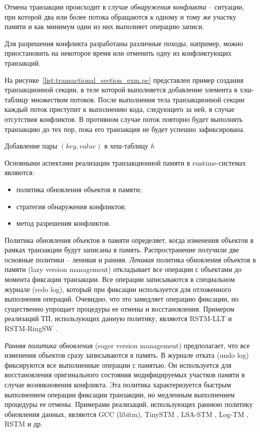 Отмена транзакции происходит в случае \textit{обнаружения конфликта} -- ситуации, при которой два или более потока обращаются к одному и тому же участку памяти и как минимум один из них выполняет операцию записи.

Для разрешения конфликта разработаны различные походы, например, можно приостановить на некоторое время или отменить одну из конфликтующих транзакций.

На рисунке~\ref{list:transactional_section_exm.pc} представлен пример создания транзакционной секции, в теле которой выполняется добавление элемента в хэш-таблицу множеством потоков. После выполнения тела транзакционной секции каждый поток приступит к выполнению кода, следующего за ней, в случае отсутствия конфликтов. В противном случае поток повторно будет выполнять транзакцию до тех пор, пока его транзакция не будет успешно зафиксирована.

\begin{ListingEnv}[!h]
  
    \caption{Добавление пары $(key, value)$ в хеш-таблицу $h$}
    \label{list:transactional_section_exm.pc}
\end{ListingEnv}

Основными аспектами реализации транзакционной памяти в runtime-системах являются:
\begin{itemize}
\item политика обновления объектов в памяти;
\item стратегия обнаружения конфликтов;
\item метод разрешения конфликтов.
\end{itemize}

Политика обновления объектов в памяти определяет, когда изменения объектов в рамках транзакции будут записаны в память. Распространение получили две основные политики -- ленивая и ранняя. \textit{Ленивая} политика обновления объектов в памяти (lazy version management) откладывает все операции с объектами до момента фиксации транзакции. Все операции записываются в специальном журнале (redo log), который при фиксации используется для отложенного выполнения операций. Очевидно, что это замедляет операцию фиксации, но существенно упрощает процедуры ее отмены и восстановления. Примером реализаций ТП, использующих данную политику, являются RSTM-LLT \cite{rstm_proj} и RSTM-RingSW \cite{spear_strategy_for_cm, spear_ringstm}.

\textit{Ранняя политика обновления} (eager version management) предполагает, что все изменения объектов сразу записываются в память. В журнале отката (undo log) фиксируются все выполненные операции с памятью. Он используется для восстановления оригинального состояния модифицируемых участков памяти в случае возникновения конфликта. Эта политика характеризуется быстрым выполнением операции фиксации транзакции, но медленным выполнением процедуры ее отмены. Примерами реализаций, использующих раннюю политику обновления данных, являются GCC (libitm), TinySTM \cite{felber_fetzer_marlier_riegel}, LSA-STM \cite{riegel_felber_fetzer}, Log-TM \cite{kevin_bobba_logtm}, RSTM \cite{rstm_proj} и др.
 
